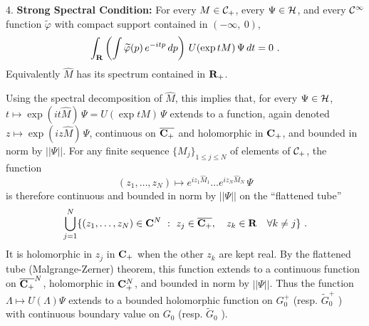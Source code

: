 \documentclass[a4paper,a4paper]{article}
\def\bC{{\bf C}}
\def\bR{{\bf R}}
\def\Rp{{\bf R}_+}
\def\CC{{\cal C}}
\def\HH{{\cal H}}
\def\wh{\widehat}
\def\wt{\widetilde}
\def\ovl{\overline}
\def \vhi{\varphi}
\begin{document}
\begin{description}
\item{4.} {\bf Strong Spectral Condition:}
For every $M \in \CC_+$, every $\Psi \in \HH$, and every $\CC^\infty$
function $\wt \vhi$ with compact support contained in
$(-\infty,\ 0)$,
\begin{equation}
\int_{\bR} \left ( \int \wt \vhi(p)\,e^{-itp}\,dp \right )\,
U(\exp tM)\,\Psi\,dt = 0\ .
\label{4.8}\end{equation}
Equivalently $\wh M$ has its spectrum contained in $\Rp$.
\end{description}

Using the spectral decomposition of $\wh M$, this implies that,
for every $\Psi \in \HH$,
$t \mapsto \exp(it \wh M)\,\Psi = U(\exp tM)\,\Psi$ extends to
a function, again denoted $z \mapsto \exp(iz \wh M)\,\Psi$,
continuous on $\ovl{\bC_+}$ and holomorphic in $\bC_+$,
and bounded in norm by $||\Psi||$.
For any finite sequence $\{M_j\}_{1 \le j \le N}$ of elements of
$\CC_+$, the function
\begin{equation}
(z_1,\ldots,z_N) \mapsto
e^{iz_1 \wh M_1}\ldots e^{iz_N \wh M_N}\, \Psi
\label{4.9}\end{equation}
is therefore continuous and bounded in norm by $||\Psi||$
on the ``flattened tube''
\begin{equation}
\bigcup_{j=1}^N \{(z_1,\ldots,z_N) \in \bC^N\ :\
z_j \in \ovl{\bC_+},\ \ \ z_k \in \bR\ \ \ \forall k \not= j\}\ .
\label{4.10}\end{equation}
It is holomorphic in $z_j$ in $\bC_+$ when the other $z_k$ are kept
real.
By the flattened tube (Malgrange-Zerner) theorem, this function
extends to a continuous function on $\ovl{\bC_+}^N$,
holomorphic in $\bC_+^N$, and bounded in norm by $||\Psi||$. Thus
the function
$\Lambda \mapsto U(\Lambda)\Psi$ extends to a bounded holomorphic
function on $G_0^+$ (resp. $\wt G_0^+$ ) with continuous
boundary value on $G_0$ (resp. $\wt G_0$ ).
\end{document}
